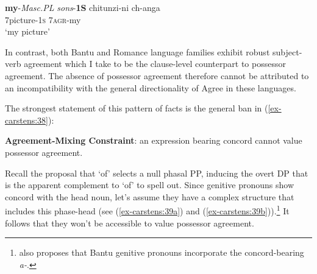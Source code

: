 \documentclass[output=paper
,modfonts
,nonflat]{langsci/langscibook}
\begin{document}
\begin{exe} \settowidth{}
\ex\label{ex-carstens:37} \xlist
\ex *\textbf{my}-\textit{Masc.PL} \textit{sons}-\textbf{1S} 
\ex 
\gll *chitunzi-ni   ch-anga  \\ 
7picture-1\textsc{s} 7\textsc{agr}-my\\ 
\glt `my picture'
\endxlist
\end{exe}
In contrast, both Bantu and Romance language families exhibit robust subject-verb agreement which I take to be the clause-level counterpart to possessor agreement. The absence of possessor agreement therefore cannot be attributed to an incompatibility with the general directionality of Agree in these languages. 

The strongest statement of this pattern of facts is the general ban in (\ref{ex-carstens:38}): 

\begin{exe}
\ex\label{ex-carstens:38} \textbf{Agreement-Mixing Constraint}: an expression bearing concord cannot value possessor   agreement.
\end{exe}
Recall the proposal that `of' selects a null phasal PP, inducing the overt DP that is the apparent complement to ‘of’ to spell out. Since genitive pronouns show concord with the head noun, let’s assume they have a complex structure that includes this phase-head (see (\ref{ex-carstens:39a}) and (\ref{ex-carstens:39b})).\footnote{\citet{Spencer2007} also proposes that Bantu genitive pronouns incorporate the concord-bearing \textit{a-}.} It follows that they won't be accessible to value possessor agreement. 
\end{document}
